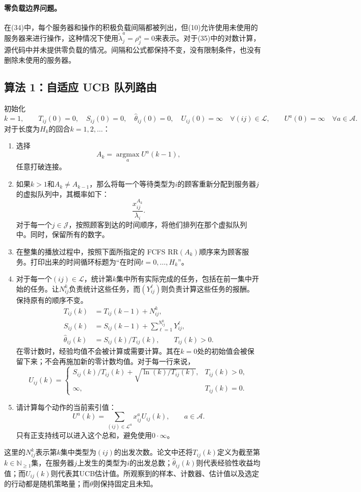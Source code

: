 \documentclass{article}
\begin{document}
\paragraph{零负载边界问题。}
在(34)中，每个服务器和操作的积极负载间隔都被列出，但(10)允许使用未使用的服务器来进行操作，这种情况下使用$\widetilde\lambda^a_j=\rho^a_j=0$来表示。对于(35)中的对数计算，源代码中并未提供零负载的情况。间隔和公式都保持不变，没有限制条件，也没有删除未使用的服务器。

\subsection*{算法 1：自适应 UCB 队列路由}

初始化
\[
k=1,\qquad
T_{ij}(0)=0,\quad S_{ij}(0)=0,\quad\widehat\theta_{ij}(0)=0,\quad U_{ij}(0)=\infty
\quad\forall(ij)\in\mathcal L,
\qquad U^a(0)=\infty\quad\forall a\in\mathcal A.
\]
对于长度为$H_k$的回合$k=1,2,\ldots$：
\begin{enumerate}
\item 选择
\[
A_k=\operatorname*{argmax}_{a}U^a(k-1),
\]
任意打破连接。
\item 如果$k>1$和$A_k\ne A_{k-1}$，那么将每一个等待类型为$i$的顾客重新分配到服务器$j$的虚拟队列中，其概率如下：
\[
\frac{x^{A_k}_{ij}}{\lambda_i}.
\]
对于每一个$j\in\mathcal J$，按照顾客到达的时间顺序，将他们排列在那个虚拟队列中。同时，保留所有的数字。
\item 在整集的播放过程中，按照下面所指定的 FCFS RR$(A_k)$顺序来为顾客服务。打印出来的时间循环标题为“在时间$t=0,\ldots,H_k$”。
\item 对于每一个$(ij)\in\mathcal L$，统计第$k$集中所有实际完成的任务，包括在前一集中开始的任务。让$N^k_{ij}$负责统计这些任务，而$(Y^\ell_{ij})$则负责计算这些任务的报酬。保持原有的顺序不变。
\begin{align}
T_{ij}(k)&=T_{ij}(k-1)+N^k_{ij},\tag{30}\\
S_{ij}(k)&=S_{ij}(k-1)+\sum_{\ell=1}^{N^k_{ij}}Y^\ell_{ij},\\
\widehat\theta_{ij}(k)&=S_{ij}(k)/T_{ij}(k),\qquad T_{ij}(k)>0.\tag{31}
\end{align}
在零计数时，经验均值不会被计算或需要计算。其在$k=0$处的初始值会被保留下来；不会再施加新的零计数均值。对于每一行来说，
\begin{equation}
U_{ij}(k)=\begin{cases}
S_{ij}(k)/T_{ij}(k)+\sqrt{\ln(k)/T_{ij}(k)},&T_{ij}(k)>0,\\
\infty,&T_{ij}(k)=0.
\end{cases}\tag{32}
\end{equation}
\item 请计算每个动作的当前索引值：
\begin{equation}
U^a(k)=\sum_{(ij)\in\mathcal L^a}x^a_{ij}U_{ij}(k),\qquad a\in\mathcal A.\tag{33}
\end{equation}
只有正支持线可以进入这个总和，避免使用$0\cdot\infty$。
\end{enumerate}
这里的$N^k_{ij}$表示第$k$集中类型为$(ij)$的出发次数。论文中还将$T_{ij}(k)$定义为截至第$k\in\mathbb N_{\geq1}$集，在服务器$j$上发生的类型为$i$的出发总数；$\widehat\theta_{ij}(k)$则代表经验性收益均值；而$U_{ij}(k)$则代表其UCB估计值。所观察到的样本、计数器、估计值以及选定的行动都是随机策略量；而$\theta$则保持固定且未知。
\end{document}
